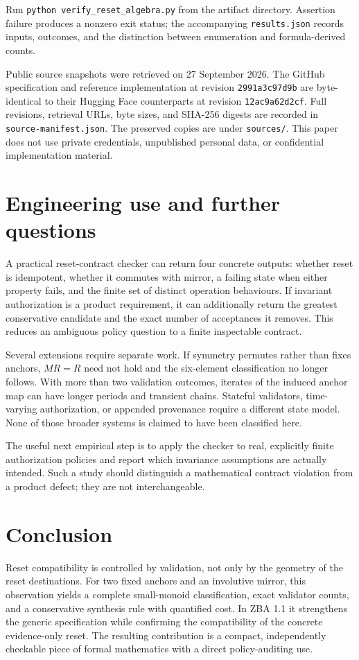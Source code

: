 \documentclass[11pt,a4paper]{article}
\begin{document}
Run \texttt{python verify\_reset\_algebra.py} from the artifact directory. Assertion failure produces a nonzero exit status; the accompanying \texttt{results.json} records inputs, outcomes, and the distinction between enumeration and formula-derived counts.

Public source snapshots were retrieved on 27 September 2026. The GitHub specification and reference implementation at revision \texttt{2991a3c97d9b} are byte-identical to their Hugging Face counterparts at revision \texttt{12ac9a62d2cf}. Full revisions, retrieval URLs, byte sizes, and SHA-256 digests are recorded in \texttt{source-manifest.json}. The preserved copies are under \texttt{sources/}. This paper does not use private credentials, unpublished personal data, or confidential implementation material.

\section{Engineering use and further questions}
A practical reset-contract checker can return four concrete outputs: whether reset is idempotent, whether it commutes with mirror, a failing state when either property fails, and the finite set of distinct operation behaviours. If invariant authorization is a product requirement, it can additionally return the greatest conservative candidate and the exact number of acceptances it removes. This reduces an ambiguous policy question to a finite inspectable contract.

Several extensions require separate work. If symmetry permutes rather than fixes anchors, $MR=R$ need not hold and the six-element classification no longer follows. With more than two validation outcomes, iterates of the induced anchor map can have longer periods and transient chains. Stateful validators, time-varying authorization, or appended provenance require a different state model. None of those broader systems is claimed to have been classified here.

The useful next empirical step is to apply the checker to real, explicitly finite authorization policies and report which invariance assumptions are actually intended. Such a study should distinguish a mathematical contract violation from a product defect; they are not interchangeable.

\section{Conclusion}
Reset compatibility is controlled by validation, not only by the geometry of the reset destinations. For two fixed anchors and an involutive mirror, this observation yields a complete small-monoid classification, exact validator counts, and a conservative synthesis rule with quantified cost. In ZBA 1.1 it strengthens the generic specification while confirming the compatibility of the concrete evidence-only reset. The resulting contribution is a compact, independently checkable piece of formal mathematics with a direct policy-auditing use.
\end{document}
